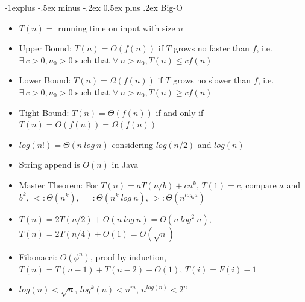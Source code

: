\documentclass[10pt, landscape]{article}
\makeatletter
\renewcommand{\section}{\@startsection{section}{1}{0mm}%
                                {-1ex plus -.5ex minus -.2ex}%
                                {0.5ex plus .2ex}%
                                {\normalfont\large\bfseries}}
\renewcommand{\section}{\@startsection{section}{2}{0mm}%
                                {-1explus -.5ex minus -.2ex}%
                                {0.5ex plus .2ex}%
                                {\normalfont\normalsize\bfseries}}
\makeatother
\begin{document}
\raggedright
\footnotesize
\begin{multicols*}{4}

\setlength{\columnseprule}{0.25pt}
\setlength{\premulticols}{1pt}
\setlength{\postmulticols}{1pt}
\setlength{\multicolsep}{1pt}
\setlength{\columnsep}{2pt}

\begin{center}
\end{center}

\section{Big-O}
\begin{itemize}
    \item $T(n)=$ running time on input with size $n$
    \item Upper Bound: $T(n)=O(f(n))$ if $T$ grows no faster than $f$, i.e. $\exists\ c > 0, n_0 > 0$ such that $\forall \ n > n_0, T(n) \leq cf(n)$
    \item Lower Bound: $T(n)=\Omega(f(n))$ if $T$ grows no slower than $f$, i.e. $\exists\ c > 0, n_0 > 0$ such that $\forall \ n > n_0, T(n) \geq cf(n)$
    \item Tight Bound: $T(n)=\Theta(f(n))$ if and only if $T(n)=O(f(n))=\Omega(f(n))$
    \item $log(n!)=\Theta(n\ log\ n)$ considering $log(n/2)$ and $log(n)$
    \item String append is $O(n)$ in Java
    \item Master Theorem: For $T(n)=aT(n/b)+cn^k$, $T(1)=c$, compare $a$ and $b^k$, $<: \Theta(n^k)$, $=:\Theta(n^k \ log \ n)$, $>: \Theta(n^{log_ba})$
    \item $T(n)=2T(n/2)+O(n\ log \ n)=O(n\ log^2\ n)$, $T(n)=2T(n/4)+O(1)=O(\sqrt{n})$
    \item Fibonacci: $O(\phi^n)$, proof by induction, $T(n)=T(n-1)+T(n-2)+O(1)$, $T(i)=F(i)-1$
    \item $log(n)<\sqrt{n}$, $log^k(n)<n^m$, $n^{log(n)}<2^n$
\end{itemize}


\end{multicols*}
\end{document}
